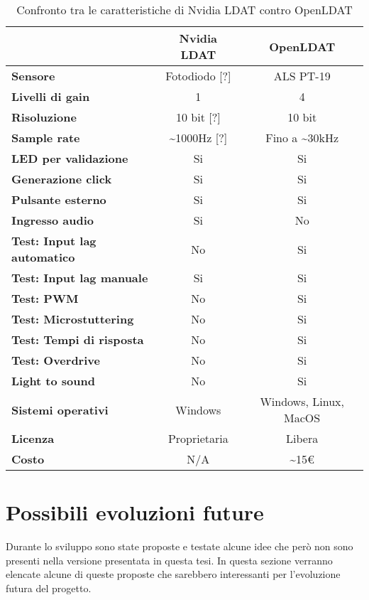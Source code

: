 \begin{table}[h!]
	\centering
	\begin{tabular}{|l|c|c|} 
		\hline
		& \textbf{Nvidia LDAT} & \textbf{OpenLDAT}  \\ 
		\hline
		\textbf{Sensore} & Fotodiodo [?] & ALS PT-19 \\
		\hline
		\textbf{Livelli di gain} & 1 & 4 \\
		\hline
		\textbf{Risoluzione} & 10 bit [?] & 10 bit \\
		\hline
		\textbf{Sample rate} & \textasciitilde 1000Hz [?] & Fino a \textasciitilde 30kHz \\
		\hline
		\textbf{LED per validazione} & Si & Si \\
		\hline
		\textbf{Generazione click} & Si & Si \\
		\hline
		\textbf{Pulsante esterno} & Si & Si \\
		\hline
		\textbf{Ingresso audio} & Si & No \\
		\hline
		\textbf{Test: Input lag automatico} & No & Si \\
		\hline
		\textbf{Test: Input lag manuale} & Si & Si \\
		\hline
		\textbf{Test: PWM} & No & Si \\
		\hline
		\textbf{Test: Microstuttering} & No & Si \\
		\hline
		\textbf{Test: Tempi di risposta} & No & Si \\
		\hline
		\textbf{Test: Overdrive} & No & Si \\
		\hline
		\textbf{Light to sound} & No & Si \\
		\hline
		\textbf{Sistemi operativi} & Windows & Windows, Linux, MacOS \\
		\hline
		\textbf{Licenza} & Proprietaria & Libera \\
		\hline
		\textbf{Costo} & N/A & \textasciitilde 15€ \\
		\hline
	\end{tabular}
	\caption{\label{tab:openldat_nvidialdat_comparison}Confronto tra le caratteristiche di Nvidia LDAT contro OpenLDAT}
\end{table}

\section{Possibili evoluzioni future}
Durante lo sviluppo sono state proposte e testate alcune idee che però non sono presenti nella versione presentata in questa tesi. In questa sezione verranno elencate alcune di queste proposte che sarebbero interessanti per l'evoluzione futura del progetto.

